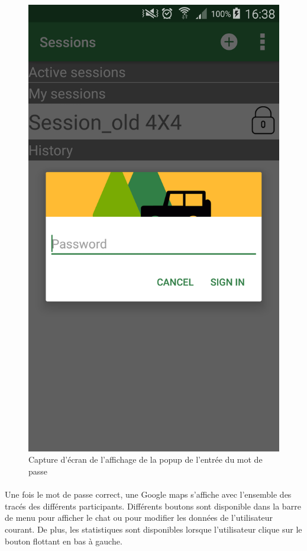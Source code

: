 \documentclass[titlepage, 12pt]{report}
\begin{document}
\begin{figure}[!h]
	\caption{Capture d'écran de l'affichage de la popup de l'entrée du mot de passe}
	\label{screenshots_password}
	\centering
	\includegraphics[scale=0.2]{Images/screenshots/password.png}
\end{figure}

\clearpage

\paragraph{}Une fois le mot de passe correct, une Google maps s'affiche avec l'ensemble des tracés des différents participants. Différents boutons sont disponible dans la barre de menu pour afficher le chat ou pour modifier les données de l'utilisateur courant. De plus, les statistiques sont disponibles lorsque l'utilisateur clique sur le bouton flottant en bas à gauche.
\end{document}
